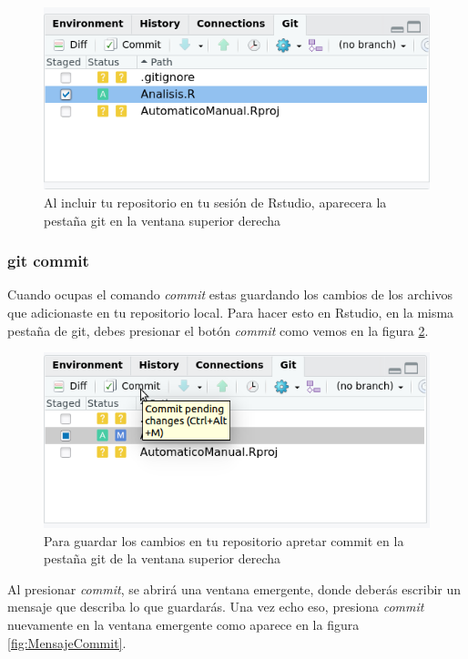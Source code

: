 \documentclass[]{book}
\begin{document}
\begin{figure}

{\centering \includegraphics[width=0.8\linewidth]{GitAdd} 

}

\caption{Al incluir tu repositorio en tu sesión de Rstudio, aparecera la pestaña git en la ventana superior derecha}\label{fig:Add}
\end{figure}

\hypertarget{git-commit}{%
\subsubsection{git commit}\label{git-commit}}

Cuando ocupas el comando \emph{commit} estas guardando los cambios de
los archivos que adicionaste en tu repositorio local. Para hacer esto en
Rstudio, en la misma pestaña de git, debes presionar el botón
\emph{commit} como vemos en la figura \ref{fig:Commit}.

\begin{figure}

{\centering \includegraphics[width=0.8\linewidth]{Commit} 

}

\caption{Para guardar los cambios en tu repositorio apretar commit en la pestaña git de la ventana superior derecha}\label{fig:Commit}
\end{figure}

Al presionar \emph{commit}, se abrirá una ventana emergente, donde
deberás escribir un mensaje que describa lo que guardarás. Una vez echo
eso, presiona \emph{commit} nuevamente en la ventana emergente como
aparece en la figura \ref{fig:MensajeCommit}.
\end{document}
